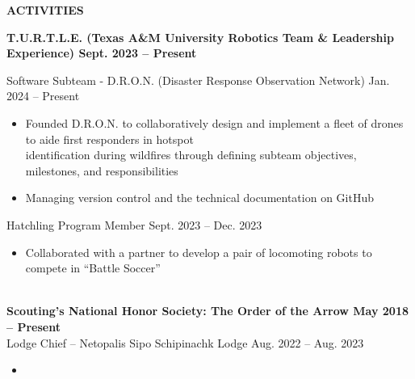 \documentclass[18pt]{article}
\begin{document}
\begin{center}
    \textbf{ACTIVITIES}
    \hrulefill
\end{center}



\textbf{T.U.R.T.L.E. (Texas A\&M University Robotics Team \& Leadership Experience) \hfill Sept. 2023 – Present} 

Software Subteam - D.R.O.N. (Disaster Response Observation Network)	\hfill Jan. 2024 – Present \\ 

\vspace{-0.75\baselineskip}
\begin{itemize}[noitemsep]
  \vspace{-\baselineskip}
  
  \item Founded D.R.O.N. to collaboratively design and implement a fleet of drones to aide first responders in hotspot\\ identification during wildfires through defining subteam objectives, milestones, and responsibilities
  \item Managing version control and the technical documentation on GitHub 
  
\end{itemize}

\vspace{-0.25\baselineskip}

{Hatchling Program Member \hfill Sept. 2023 – Dec. 2023} \\

\vspace{-0.75\baselineskip}
\begin{itemize}[noitemsep]
  \vspace{-\baselineskip}
  
  \item Collaborated with a partner to develop a pair of locomoting robots to compete in “Battle Soccer” 
  \vspace{-0.75\baselineskip}
\end{itemize}\\


\textbf{Scouting's National Honor Society: The Order of the Arrow \hfill May 2018 – Present} \\
{Lodge Chief – Netopalis Sipo Schipinachk Lodge \hfill Aug. 2022 – Aug. 2023} \\ 

\begin{itemize}[noitemsep]
  \vspace{-\baselineskip}
  \item 
  \vspace{-\baselineskip}
\end{itemize}\\
\end{document}
